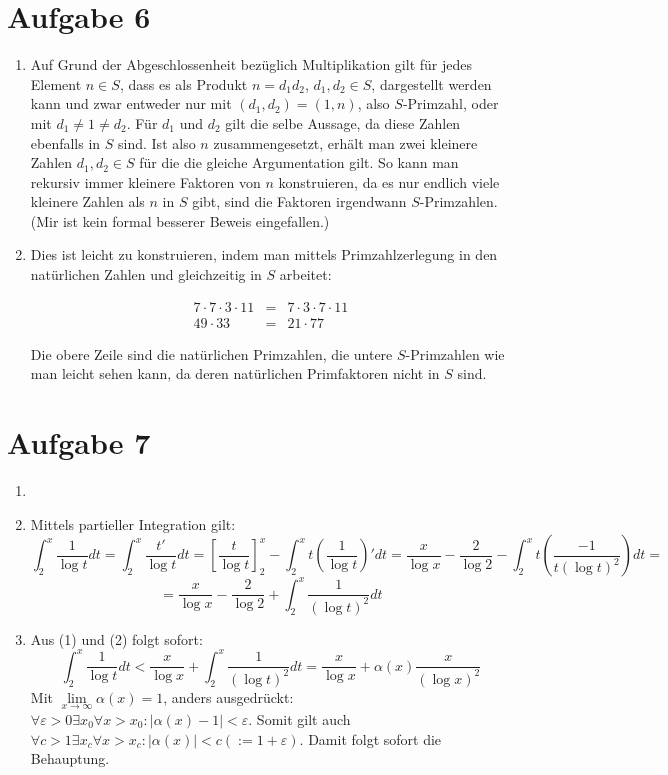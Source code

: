 \section*{Aufgabe 6}
\begin{enumerate}[(1)]
\item Auf Grund der Abgeschlossenheit bezüglich Multiplikation gilt für jedes Element $n \in S$, dass es als Produkt $n = d_1 d_2$, $d_1, d_2 \in S$, 
dargestellt werden kann und zwar entweder nur mit $(d_1, d_2) = (1, n)$, also $S$-Primzahl, oder mit $d_1 \neq 1 \neq d_2$. Für $d_1$ und $d_2$ gilt die selbe Aussage,
da diese Zahlen ebenfalls in $S$ sind. Ist also $n$ zusammengesetzt, erhält man zwei kleinere Zahlen $d_1, d_2 \in S$ für die die gleiche Argumentation gilt. So kann man
rekursiv immer kleinere Faktoren von $n$ konstruieren, da es nur endlich viele kleinere Zahlen als $n$ in $S$ gibt, sind die Faktoren irgendwann $S$-Primzahlen.
(Mir ist kein formal besserer Beweis eingefallen.)

\item Dies ist leicht zu konstruieren, indem man mittels Primzahlzerlegung in den natürlichen Zahlen und gleichzeitig in $S$ arbeitet:

\begin{eqnarray}  7 \cdot 7 \cdot 3 \cdot 11 & =& 7 \cdot 3 \cdot 7 \cdot 11 \\ 49 \cdot 33 &=& 21 \cdot 77  \end{eqnarray}

Die obere Zeile sind die natürlichen Primzahlen, die untere $S$-Primzahlen wie man leicht sehen kann, da deren natürlichen Primfaktoren nicht in $S$ sind.

\end{enumerate}


\section*{Aufgabe 7}
\begin{enumerate}[(1)]
\item

\item Mittels partieller Integration gilt:
\[ \int_2^x \frac{1}{\log t} dt = \int_2^x \frac{t'}{\log t} dt =  \left[ \frac{t}{\log t} \right]_2^x -  \int_2^x t \left(\frac{1}{\log t}\right)' dt = 
\frac{x}{\log x} - \frac{2}{\log 2} - \int_2^x t \left(  \frac{-1}{t (\log t)^2}  \right) dt = \]
\[ = \frac{x}{\log x} - \frac{2}{\log 2} + \int_2^x \frac{1}{(\log t)^2}  dt \]

\item Aus (1) und (2) folgt sofort:
\[ \int_2^x  \frac{1}{\log t} dt < \frac{x}{\log x} + \int_2^x \frac{1}{(\log t)^2}  dt =  \frac{x}{\log x} + \alpha(x) \frac{x}{(\log x)^2} \]
Mit $\underset{x \rightarrow \infty}{\lim} \alpha(x) = 1$, anders ausgedrückt: $\forall \varepsilon > 0 \exists x_0 \forall x > x_0 : |\alpha(x) - 1 | < \varepsilon$. Somit gilt auch
$\forall c > 1 \exists x_c \forall x > x_c : | \alpha(x) | < c (:= 1 + \varepsilon) $. Damit folgt sofort die Behauptung.

\end{enumerate}

